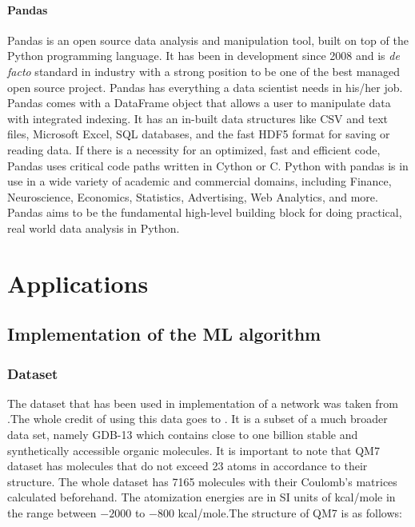 \documentclass[a4paper,oneside,openright,11pt]{book}
\begin{document}
\subsection{Pandas}

Pandas \cite{pandas} is an open source data analysis and manipulation tool, built on top of the Python programming language. It has been in development since 2008 and is \emph{de facto} standard in industry with a strong position to be one of the best managed open source project. Pandas has everything a data scientist needs in his/her job. Pandas comes with a DataFrame object that allows a user to manipulate data with integrated indexing. It has an in-built data structures like CSV and text files, Microsoft Excel, SQL databases, and the fast HDF5 format for saving or reading data. If there is a necessity for an optimized, fast and efficient code, Pandas uses critical code paths written in Cython or C. Python with pandas is in use in a wide variety of academic and commercial domains, including Finance, Neuroscience, Economics, Statistics, Advertising, Web Analytics, and more. Pandas aims to be the fundamental high-level building block for doing practical, real world data analysis in Python.




\part{Applications}

\chapter{Implementation of the ML algorithm}

\section{Dataset}

The dataset that has been used in implementation of a network was taken from \cite{dataset}.The whole credit of using this data goes to \cite{blum} \cite{rupp}. It is a subset of a much broader data set, namely GDB-13 which contains close to one billion stable and synthetically accessible organic molecules. It is important to note that QM7 dataset has molecules that do not exceed 23 atoms in accordance to their structure. The whole dataset has 7165 molecules with their Coulomb's matrices calculated beforehand. The atomization energies are in SI units of kcal/mole in the range between $-2000$ to $-800$ kcal/mole.The structure of QM7 is as follows:
\end{document}
